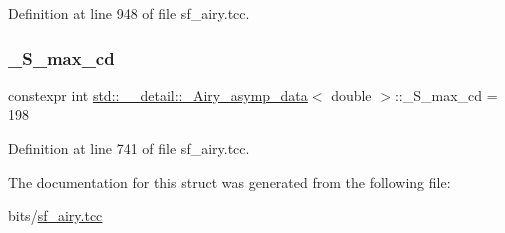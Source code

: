 Definition at line 948 of file sf\+\_\+airy.\+tcc.

\mbox{\label{structstd_1_1____detail_1_1__Airy__asymp__data_3_01double_01_4_a38e485184d2762e83a27937efc343d01}} 
\subsubsection{\texorpdfstring{\+\_\+\+S\+\_\+max\+\_\+cd}{\_S\_max\_cd}}
{\footnotesize\ttfamily constexpr int \hyperlink{structstd_1_1____detail_1_1__Airy__asymp__data}{std\+::\+\_\+\+\_\+detail\+::\+\_\+\+Airy\+\_\+asymp\+\_\+data}$<$ double $>$\+::\+\_\+\+S\+\_\+max\+\_\+cd = 198\hspace{0.3cm}{\ttfamily [static]}}



Definition at line 741 of file sf\+\_\+airy.\+tcc.



The documentation for this struct was generated from the following file\+:\begin{DoxyCompactItemize}
\item 
bits/\hyperlink{sf__airy_8tcc}{sf\+\_\+airy.\+tcc}\end{DoxyCompactItemize}

